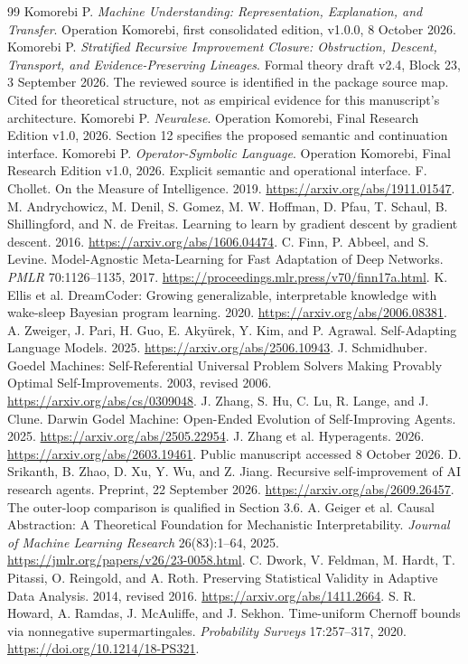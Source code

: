\documentclass[11pt,letterpaper]{article}
\theoremstyle{plain}
\theoremstyle{definition}
\begin{document}
\clearpage{}
\begin{thebibliography}{99}\small
{} Komorebi P. \emph{Machine Understanding: Representation, Explanation, and Transfer}. Operation Komorebi, first consolidated edition, v1.0.0, 8 October 2026.
 Komorebi P. \emph{Stratified Recursive Improvement Closure: Obstruction, Descent, Transport, and Evidence-Preserving Lineages}. Formal theory draft v2.4, Block 23, 3 September 2026. The reviewed source is identified in the package source map. Cited for theoretical structure, not as empirical evidence for this manuscript's architecture.
 Komorebi P. \emph{Neuralese}. Operation Komorebi, Final Research Edition v1.0, 2026. Section 12 specifies the proposed semantic and continuation interface.
 Komorebi P. \emph{Operator-Symbolic Language}. Operation Komorebi, Final Research Edition v1.0, 2026. Explicit semantic and operational interface.
 F. Chollet. On the Measure of Intelligence. 2019. \url{https://arxiv.org/abs/1911.01547}.
 M. Andrychowicz, M. Denil, S. Gomez, M. W. Hoffman, D. Pfau, T. Schaul, B. Shillingford, and N. de Freitas. Learning to learn by gradient descent by gradient descent. 2016. \url{https://arxiv.org/abs/1606.04474}.
 C. Finn, P. Abbeel, and S. Levine. Model-Agnostic Meta-Learning for Fast Adaptation of Deep Networks. \emph{PMLR} 70:1126--1135, 2017. \url{https://proceedings.mlr.press/v70/finn17a.html}.
 K. Ellis et al. DreamCoder: Growing generalizable, interpretable knowledge with wake-sleep Bayesian program learning. 2020. \url{https://arxiv.org/abs/2006.08381}.
 A. Zweiger, J. Pari, H. Guo, E. Aky\"urek, Y. Kim, and P. Agrawal. Self-Adapting Language Models. 2025. \url{https://arxiv.org/abs/2506.10943}.
 J. Schmidhuber. Goedel Machines: Self-Referential Universal Problem Solvers Making Provably Optimal Self-Improvements. 2003, revised 2006. \url{https://arxiv.org/abs/cs/0309048}.
 J. Zhang, S. Hu, C. Lu, R. Lange, and J. Clune. Darwin Godel Machine: Open-Ended Evolution of Self-Improving Agents. 2025. \url{https://arxiv.org/abs/2505.22954}.
 J. Zhang et al. Hyperagents. 2026. \url{https://arxiv.org/abs/2603.19461}. Public manuscript accessed 8 October 2026.
 D. Srikanth, B. Zhao, D. Xu, Y. Wu, and Z. Jiang. Recursive self-improvement of AI research agents. Preprint, 22 September 2026. \url{https://arxiv.org/abs/2609.26457}. The outer-loop comparison is qualified in Section 3.6.
 A. Geiger et al. Causal Abstraction: A Theoretical Foundation for Mechanistic Interpretability. \emph{Journal of Machine Learning Research} 26(83):1--64, 2025. \url{https://jmlr.org/papers/v26/23-0058.html}.
 C. Dwork, V. Feldman, M. Hardt, T. Pitassi, O. Reingold, and A. Roth. Preserving Statistical Validity in Adaptive Data Analysis. 2014, revised 2016. \url{https://arxiv.org/abs/1411.2664}.
 S. R. Howard, A. Ramdas, J. McAuliffe, and J. Sekhon. Time-uniform Chernoff bounds via nonnegative supermartingales. \emph{Probability Surveys} 17:257--317, 2020. \url{https://doi.org/10.1214/18-PS321}.
\end{thebibliography}
\end{document}
